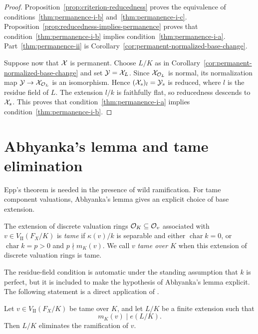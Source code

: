 \begin{proof}
    Proposition~\ref{prop:criterion-reducedness} proves the equivalence of conditions~\ref{thm:permanence-i-b} and~\ref{thm:permanence-i-c}.
    Proposition~\ref{prop:reducedness-implies-permanence} proves that condition~\ref{thm:permanence-i-b} implies condition~\ref{thm:permanence-i-a}.
    Part~\ref{thm:permanence-ii} is Corollary~\ref{cor:permanent-normalized-base-change}.

    Suppose now that $\mathcal X$ is permanent.
    Choose $L/K$ as in Corollary~\ref{cor:permanent-normalized-base-change} and set $\mathcal Y=\mathcal X_L$.
    Since $\mathcal X_{\mathcal O_L}$ is normal, its normalization map $\mathcal Y\to\mathcal X_{\mathcal O_L}$ is an isomorphism.
    Hence $(\mathcal X_s)_l=\mathcal Y_s$ is reduced, where $l$ is the residue field of $L$.
    The extension $l/k$ is faithfully flat, so reducedness descends to $\mathcal X_s$.
    This proves that condition~\ref{thm:permanence-i-a} implies condition~\ref{thm:permanence-i-b}.
\end{proof}

\section{Abhyanka's lemma and tame elimination}\label{sec:abhyanka-tame-elimination}

Epp's theorem is needed in the presence of wild ramification.
For tame component valuations, Abhyanka's lemma gives an explicit choice of base extension.

\begin{definition}\label{def:tame-type-II-valuation}
    The extension of discrete valuation rings $\mathcal O_K\subseteq\mathcal{O}_v$ associated with $v\in V_\mathrm{II}(F_X/K)$ is \textit{tame} if $\kappa(v)/k$ is separable and either $\operatorname{char}k=0$, or $\operatorname{char}k=p>0$ and $p\nmid m_K(v)$.
    We call $v$ \textit{tame over $K$} when this extension of discrete valuation rings is tame.
\end{definition}

The residue-field condition is automatic under the standing assumption that $k$ is perfect, but it is included to make the hypothesis of Abhyanka's lemma explicit.
The following statement is a direct application of \cite[\href{https://stacks.math.columbia.edu/tag/0BRM}{Lemma 15.116.4}]{Stacks}.

\begin{lemma}[Abhyanka]\label{lem:abhyanka}
    Let $v\in V_\mathrm{II}(F_X/K)$ be tame over $K$, and let $L/K$ be a finite extension such that
    \[
        m_K(v)\mid e(L/K).
    \]
    Then $L/K$ eliminates the ramification of $v$.
\end{lemma}

